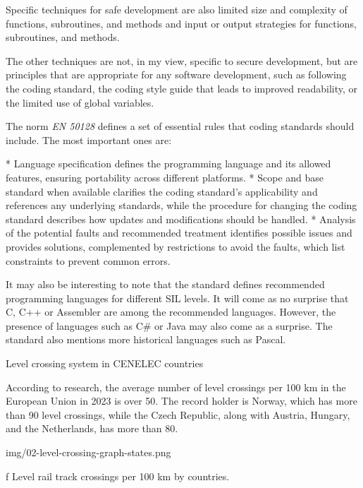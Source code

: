 Specific techniques for safe development are also {\sbf limited size and complexity of functions, subroutines, and methods} and {\sbf input or output strategies for functions, subroutines, and methods}.

The other techniques are not, in my view, specific to secure development, but are principles that are appropriate for any software development, such as following the {\sbf coding standard}, the {\sbf coding style guide} that leads to improved readability, or the {\sbf limited use of global variables}.

The norm {\it EN 50128} defines a set of essential rules that coding standards should include. The most important ones are:

\begitems
* {\sbf Language specification} defines the programming language and its allowed features, ensuring {\sbf portability} across different platforms.  
* {\sbf Scope and base standard when available} clarifies the coding standard’s applicability and references any underlying standards, while {\sbf the procedure for changing the coding standard} describes how updates and modifications should be handled.  
* {\sbf Analysis of the potential faults and recommended treatment} identifies possible issues and provides solutions, complemented by {\sbf restrictions to avoid the faults}, which list constraints to prevent common errors.  
\enditems


It may also be interesting to note that the standard defines {\sbf recommended programming languages} for different SIL levels. It will come as no surprise that C, C++ or Assembler are among the recommended languages. However, the presence of languages such as C\# or Java may also come as a surprise. The standard also mentions more historical languages such as Pascal.



\sec Level crossing system in CENELEC countries

According to research, the average number of level crossings per 100 km in the European Union in 2023 is over 50. The record holder is Norway, which has more than 90 level crossings, while the Czech Republic, along with Austria, Hungary, and the Netherlands, has more than 80.

\medskip
{}
\picw=14cm \cinspic img/02-level-crossing-graph-states.png
\caption/f Level rail track crossings per 100 km by countries.
\medskip

